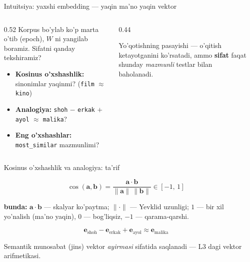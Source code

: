 \documentclass[aspectratio=169,11pt]{beamer}
\newcommand{\bunda}[1]{{\small\textbf{bunda:}\; #1}}
\begin{document}
\begin{frame}{Intuitsiya: yaxshi embedding --- yaqin ma'no yaqin vektor}
  \begin{columns}[T]
    \begin{column}{0.52\textwidth}
      \small
      Korpus bo'ylab ko'p marta o'tib (epoch), $W$ ni yangilab boramiz. Sifatni
      qanday tekshiramiz?
      \begin{itemize}\setlength\itemsep{2pt}
        \item \textbf{Kosinus o'xshashlik:} sinonimlar yaqinmi?
              (\texttt{film} $\approx$ \texttt{kino})
        \item \textbf{Analogiya:} \texttt{shoh} $-$ \texttt{erkak} $+$
              \texttt{ayol} $\approx$ \texttt{malika}?
        \item \textbf{Eng o'xshashlar:} \texttt{most\_similar} mazmunlimi?
      \end{itemize}
    \end{column}
    \begin{column}{0.44\textwidth}
      \begin{tcolorbox}[okbox,top=2pt,bottom=2pt]
        \footnotesize
        Yo'qotishning pasayishi --- o'qitish ketayotganini ko'rsatadi, ammo
        \textbf{sifat} faqat shunday \emph{mazmunli} testlar bilan baholanadi.
      \end{tcolorbox}
    \end{column}
  \end{columns}
\end{frame}

\begin{frame}{Kosinus o'xshashlik va analogiya: ta'rif}
  \begin{tcolorbox}[defbox,title=Ta'rif: kosinus o'xshashlik]
    \vspace{-0.4em}
    $$ \cos(\mathbf{a},\mathbf{b}) = \frac{\mathbf{a}\cdot\mathbf{b}}
       {\|\mathbf{a}\|\,\|\mathbf{b}\|} \in [-1,\,1] $$
  \end{tcolorbox}
  \vspace{2pt}
  \bunda{$\mathbf{a}\cdot\mathbf{b}$ --- skalyar ko'paytma; $\|\cdot\|$ ---
  Yevklid uzunligi; $1$ --- bir xil yo'nalish (ma'no yaqin), $0$ --- bog'liqsiz,
  $-1$ --- qarama-qarshi.}
  \vspace{4pt}
  \begin{tcolorbox}[defbox,title={Ta'rif: vektor analogiyasi}]
    \vspace{-0.4em}
    $$ \mathbf{e}_{\text{shoh}} - \mathbf{e}_{\text{erkak}}
       + \mathbf{e}_{\text{ayol}} \approx \mathbf{e}_{\text{malika}} $$
  \end{tcolorbox}
  \footnotesize Semantik munosabat (jins) vektor \emph{ayirmasi} sifatida
  saqlanadi --- L3 dagi vektor arifmetikasi.
\end{frame}
\end{document}
